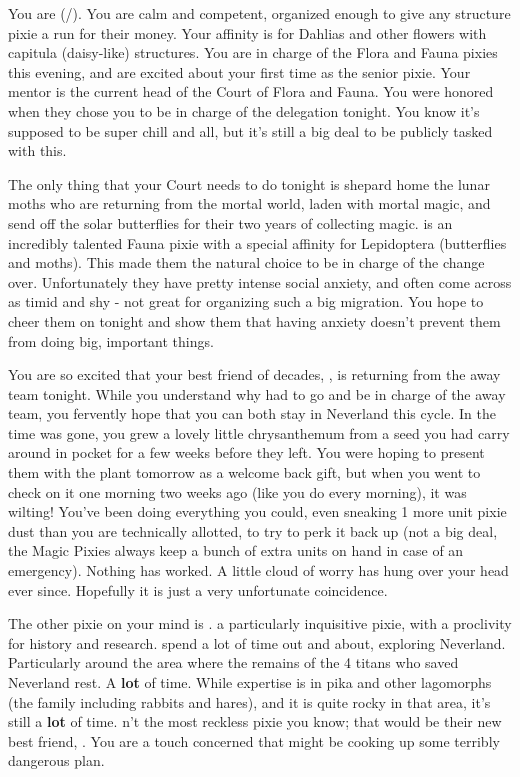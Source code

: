 \documentclass[char]{PP}
\begin{document}
\name{\cFHead{}}

You are \cFHead{} (\cFHead{\They}/\cFHead{\Them}). You are calm and competent, organized enough to give any structure pixie a run for their money. Your affinity is for Dahlias and other flowers with capitula (daisy-like) structures. You are in charge of the Flora and Fauna pixies this evening, and are excited about your first time as the senior pixie. Your mentor is the current head of the Court of Flora and Fauna. You were honored when they chose you to be in charge of the delegation tonight. You know it’s supposed to be super chill and all, but it’s still a big deal to be publicly tasked with this.

The only thing that your Court needs to do tonight is shepard home the lunar moths who are returning from the mortal world, laden with mortal magic, and send off the solar butterflies for their two years of collecting magic. \cFButterfly{} is an incredibly talented Fauna pixie with a special affinity for Lepidoptera (butterflies and moths). This made them the natural choice to be in charge of the change over. Unfortunately they have pretty intense social anxiety, and often come across as timid and shy - not great for organizing such a big migration. You hope to cheer them on tonight and show them that having anxiety doesn’t prevent them from doing big, important things.

You are so excited that your best friend of decades, \cSPM{}, is returning from the away team tonight. While you understand why \cSPM{\they} had to go and be in charge of the away team, you fervently hope that you can both stay in Neverland this cycle. In the time \cSPM{} was gone, you grew a lovely little chrysanthemum from a seed you had \cSPM{\them} carry around in \cSPM{\their} pocket for a few weeks before they left. You were hoping to present them with the plant tomorrow as a welcome back gift, but when you went to check on it one morning two weeks ago (like you do every morning), it was wilting! You’ve been doing everything you could, even sneaking 1 more unit pixie dust than you are technically allotted, to try to perk it back up (not a big deal, the Magic Pixies always keep a bunch of extra units on hand in case of an emergency). Nothing has worked. A little cloud of worry has hung over your head ever since. Hopefully it is just a very unfortunate coincidence.

The other pixie on your mind is \cFTitan{}. \cFTitan{\They} \cFTitan{\are} a particularly inquisitive pixie, with a proclivity for history and research. \cFTitan{\They} spend\cFTitan{\plural} a lot of time out and about, exploring Neverland. Particularly around the area where the remains of the 4 titans who saved Neverland rest. A \textbf{lot} of time. While \cFTitan{\their} expertise is in pika and other lagomorphs (the family including rabbits and hares), and it is quite rocky in that area, it’s still a \textbf{lot} of time. \cFTitan{\They} \cFTitan{\are}n’t the most reckless pixie you know; that would be their new best friend, \cEAirship{}. You are a touch concerned that \cFTitan{} might be cooking up some terribly dangerous plan.
\end{document}
